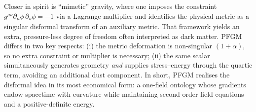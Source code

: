 \documentclass{iopjournal}
\begin{document}
Closer in spirit is ``mimetic'' gravity, where one imposes the constraint $g^{\mu\nu}\partial_\mu\phi\,\partial_\nu\phi=-1$ via a Lagrange multiplier and identifies the physical metric as a singular disformal transform of an auxiliary metric. That framework yields an extra, pressure-less degree of freedom often interpreted as dark matter. PFGM differs in two key respects: (i) the metric deformation is non-singular $(1+\alpha)$, so no extra constraint or multiplier is necessary; (ii) the same scalar simultaneously generates geometry \textit{and} supplies stress--energy through the quartic term, avoiding an additional dust component. In short, PFGM realises the disformal idea in its most economical form: a one-field ontology whose gradients endow spacetime with curvature while maintaining second-order field equations and a positive-definite energy.
\end{document}
